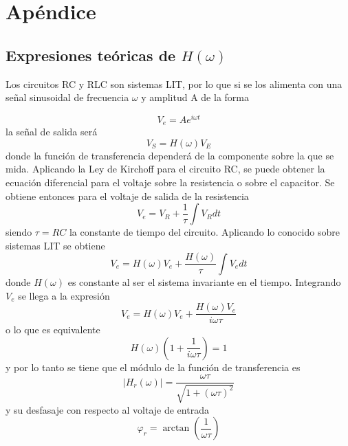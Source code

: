 \section{Apéndice} 
\subsection{Expresiones teóricas de $H(\omega)$}
Los circuitos RC y RLC son sistemas LIT, por lo que si se los alimenta con una señal sinusoidal de frecuencia $\omega$ y amplitud $\text{A}$ de la forma 

\begin{equation}
    V_e=Ae^{i\omega t}
    \label{eq:1}
\end{equation}
la señal de salida será \cite{sistemasLIT}
\begin{equation}
    V_S=H(\omega)V_E
    \label{eq:2}
\end{equation}
donde la función de transferencia dependerá de la componente sobre la que se mida. 
    Aplicando la Ley de Kirchoff  para el circuito RC, se puede obtener la ecuación diferencial para el voltaje sobre la resistencia o sobre el capacitor\cite{kip1969}. Se obtiene entonces para el voltaje de salida de la resistencia
\begin{equation}
    V_e=V_R+\frac{1}{\tau}\int V_Rdt
\end{equation}
siendo $\tau=RC$ la constante de tiempo del circuito. Aplicando lo conocido sobre sistemas LIT se obtiene
\begin{equation}
    V_e=H(\omega)V_e + \frac{H(\omega)}{\tau}\int V_edt
\end{equation}
donde $H(\omega)$ es constante al ser el sistema invariante en el tiempo. Integrando $V_e$ se llega a la expresión
\begin{equation}
    V_e=H(\omega)V_e+\frac{H(\omega)V_e}{i\omega\tau}
\end{equation}
o lo que es equivalente
\begin{equation}
    H(\omega)(1+\frac{1}{i\omega\tau})=1
\end{equation}
y por lo tanto se tiene que el módulo de la función de transferencia es
\begin{equation}
    |H_r(\omega)|=\frac{\omega\tau}{\sqrt{1+(\omega\tau)^2}}
    \label{eq:moduloRC}
\end{equation}
y su desfasaje con respecto al voltaje de entrada
    \begin{equation}
    \varphi_r=\arctan(\frac{1}{\omega\tau})
    \label{eq:3}
\end{equation}
